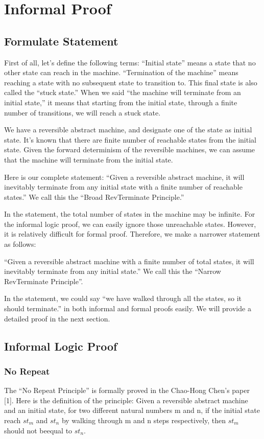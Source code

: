 \chapter{Informal Proof}
\label{chapter:secorder}

\section{Formulate Statement}

First of all, let’s define the following terms:
``Initial state'' means a state that no other state can reach in the machine.
``Termination of the machine'' means reaching a state with no subsequent state to transition to. This final state is also called the ``stuck state.''
When we said ``the machine will terminate from an initial state,'' it means that starting from the initial state, through a finite number of transitions, we will reach a stuck state.

We have a reversible abstract machine, and designate one of the state as initial state.  
It's known that there are finite number of reachable states from the initial state.  
Given the forward determinism of the reversible machines, we can assume that the machine will terminate from the initial state.

Here is our complete statement:
``Given a reversible abstract machine, it will inevitably terminate from any initial state with a finite number of reachable states.''
We call this the ``Broad RevTerminate Principle.''

In the statement, the total number of states in the machine may be infinite.
For the informal logic proof, we can easily ignore those unreachable states.  
However, it is relatively difficult for formal proof. 
Therefore, we make a narrower statement as follows:

``Given a reversible abstract machine with a finite number of total states, it will inevitably terminate from any initial state.''
We call this the ``Narrow RevTerminate Principle''.

In the statement, we could say ``we have walked through all the states, so it should terminate.'' in both informal and formal proofs easily.
We will provide a detailed proof in the next section.

\section{Informal Logic Proof}

\subsection{ No Repeat }
The ``No Repeat Principle'' is formally proved in the Chao-Hong Chen's paper [1].
Here is the definition of the principle:
Given a reversible abstract machine and an initial state, for two different natural numbers m and n, if the initial state reach $st_{m}$ and $st_{n}$ by walking through m and n steps respectively, then $st_{m}$ should not beequal to $st_{n}$.

